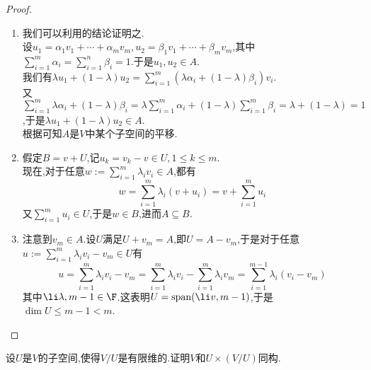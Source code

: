 \documentclass{ctexart}
\begin{document}
\begin{proof}
    \begin{enumerate}[label=\tbf{(\arabic*)}]
        \item 我们可以利用的结论证明之.\\
            设$u_1=\alpha_1v_1+\cdots+\alpha_mv_m,u_2=\beta_1v_1+\cdots+\beta_mv_m$,其中$\displaystyle\sum_{i=1}^{m}\alpha_i=\sum_{i=1}^{n}\beta_i=1$.于是$u_1,u_2\in A$.\\
            我们有$\displaystyle\lambda u_1+(1-\lambda)u_2=\sum_{i=1}^{m}\left(\lambda\alpha_i+(1-\lambda)\beta_i\right)v_i$.\\
            又$\displaystyle\sum_{i=1}^{m}\lambda\alpha_i+(1-\lambda)\beta_i=\lambda\sum_{i=1}^{m}\alpha_i+(1-\lambda)\sum_{i=1}^{m}\beta_i=\lambda+(1-\lambda)=1$,于是$\lambda u_1+(1-\lambda)u_2\in A$.\\
            根据可知$A$是$V$中某个子空间的平移.
        \item 假定$B=v+U$,记$u_k=v_k-v\in U,1\leqslant k\leqslant m$.\\
            现在,对于任意$\displaystyle w:=\sum_{i=1}^{m}\lambda_iv_i\in A$,都有
            $$w=\sum_{i=1}^{m}\lambda_i(v+u_i)=v+\sum_{i=1}^{m}u_i$$
            又$\sum_{i=1}^{m}u_i\in U$,于是$w\in B$,进而$A\subseteq B$.
        \item 注意到$v_m\in A$.设$U$满足$U+v_m=A$,即$U=A-v_m$,于是对于任意$\displaystyle u:=\sum_{i=1}^{m}\lambda_iv_i-v_m\in U$有
            $$u=\sum_{i=1}^{m}\lambda_iv_i-v_m=\sum_{i=1}^{m}\lambda_iv_i-\sum_{i=1}^{m}\lambda_iv_m=\sum_{i=1}^{m-1}\lambda_i(v_i-v_m)$$
            其中$\li \lambda,{m-1}\in\F$.这表明$U=\text{span}(\li v,{m-1})$,于是$\dim U\leqslant m-1<m$.
    \end{enumerate}
\end{proof}
\begin{problem}[13.]
    设$U$是$V$的子空间,使得$V/U$是有限维的.证明$V$和$U\times (V/U)$同构.
\end{problem}
\end{document}
